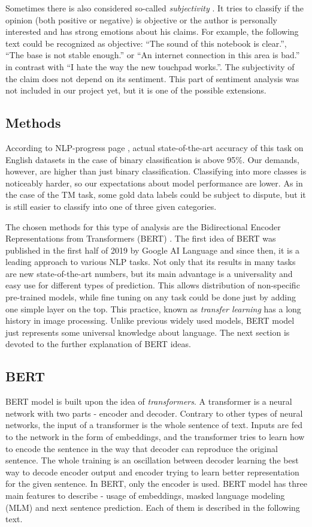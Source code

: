 Sometimes there is also considered so-called \textit{subjectivity} \cite{veselovska-2017}. It tries to classify if the opinion (both positive or negative) is objective or the author is personally interested and has strong emotions about his claims. For example, the following text could be recognized as objective: ``The sound of this notebook is clear.'', ``The base is not stable enough.'' or ``An internet connection in this area is bad.'' in contrast with ``I hate the way the new touchpad works.''. The subjectivity of the claim does not depend on its sentiment.
This part of sentiment analysis was not included in our project yet, but it is one of the possible extensions.
\subsection{Methods}
According to NLP-progress page \cite{sotasentiment}, actual state-of-the-art accuracy of this task on English datasets in the case of binary classification is above 95\%. Our demands, however, are higher than just binary classification. Classifying into more classes is noticeably harder, so our expectations about model performance are lower. As in the case of the TM task, some gold data labels could be subject to dispute, but it is still easier to classify into one of three given categories. \par
The chosen methods for this type of analysis are the Bidirectional Encoder Representations from Transformers (BERT) . The first idea of BERT was published in the first half of 2019 by Google AI Language \cite{bert} and since then, it is a leading approach to various NLP tasks. Not only that its results in many tasks are new state-of-the-art numbers, but its main advantage is a universality and easy use for different types of prediction. This allows distribution of non-specific pre-trained models, while fine tuning on any task could be done just by adding one simple layer on the top. This practice, known as \textit{transfer learning} has a long history in image processing. Unlike previous widely used models, BERT model just represents some universal knowledge about language. The next section is devoted to the further explanation of BERT ideas.
\subsection{BERT}
BERT model is built upon the idea of \textit{transformers}. A transformer is a neural network with two parts - encoder and decoder. Contrary to other types of neural networks, the input of a transformer is the whole sentence of text. Inputs are fed to the network in the form of embeddings, and the transformer tries to learn how to encode the sentence in the way that decoder can reproduce the original sentence. The whole training is an oscillation between decoder learning the best way to decode encoder output and encoder trying to learn better representation for the given sentence. In BERT, only the encoder is used. BERT model has three main features to describe - usage of embeddings, masked language modeling (MLM) and next sentence prediction. Each of them is described in the following text.
